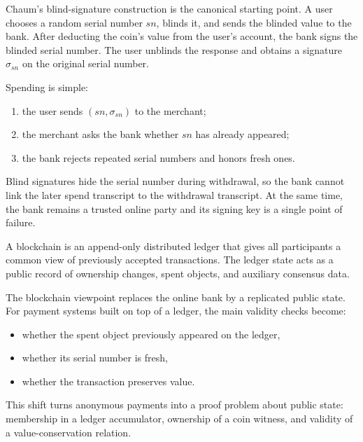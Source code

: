 \documentclass[11pt]{article}
\begin{document}
Chaum's blind-signature construction is the canonical starting point.  A user
chooses a random serial number $sn$, blinds it, and sends the blinded value to
the bank.  After deducting the coin's value from the user's account, the bank
signs the blinded serial number.  The user unblinds the response and obtains a
signature $\sigma_{sn}$ on the original serial number.

Spending is simple:
\begin{enumerate}
  \item the user sends $(sn,\sigma_{sn})$ to the merchant;
  \item the merchant asks the bank whether $sn$ has already appeared;
  \item the bank rejects repeated serial numbers and honors fresh ones.
\end{enumerate}

\begin{remark}
Blind signatures hide the serial number during withdrawal, so the bank cannot
link the later spend transcript to the withdrawal transcript.  At the same
time, the bank remains a trusted online party and its signing key is a single
point of failure.
\end{remark}

\begin{definition}
A blockchain is an append-only distributed ledger that gives all participants a
common view of previously accepted transactions.  The ledger state acts as a
public record of ownership changes, spent objects, and auxiliary consensus
data.
\end{definition}

The blockchain viewpoint replaces the online bank by a replicated public state.
For payment systems built on top of a ledger, the main validity checks become:
\begin{itemize}
  \item whether the spent object previously appeared on the ledger,
  \item whether its serial number is fresh,
  \item whether the transaction preserves value.
\end{itemize}

This shift turns anonymous payments into a proof problem about public state:
membership in a ledger accumulator, ownership of a coin witness, and validity
of a value-conservation relation.

\end{document}
